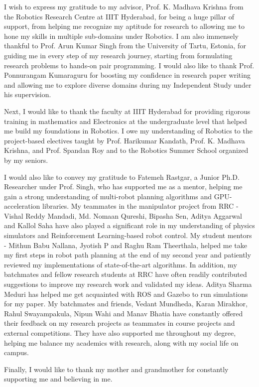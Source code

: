 I wish to express my gratitude to my advisor, Prof. K. Madhava Krishna from the Robotics Research Centre at IIIT Hyderabad, for being a huge pillar of support, from helping me recognize my aptitude for research to allowing me to hone my skills in multiple sub-domains under Robotics. I am also immensely thankful to Prof. Arun Kumar Singh from the University of Tartu, Estonia, for guiding me in every step of my research journey, starting from formulating research problems to hands-on pair programming. I would also like to thank Prof. Ponnurangam Kumaraguru for boosting my confidence in research paper writing and allowing me to explore diverse domains during my Independent Study under his supervision.

Next, I would like to thank the faculty at IIIT Hyderabad for providing rigorous training in mathematics and Electronics at the undergraduate level that helped me build my foundations in Robotics. I owe my understanding of Robotics to the project-based electives taught by Prof. Harikumar Kandath, Prof. K. Madhava Krishna, and Prof. Spandan Roy and to the Robotics Summer School organized by my seniors. 


I would also like to convey my gratitude to Fatemeh Rastgar, a Junior Ph.D. Researcher under Prof. Singh, who has supported me as a mentor, helping me gain a strong understanding of multi-robot planning algorithms and GPU-acceleration libraries. My teammates in the manipulator project from RRC - Vishal Reddy Mandadi, Md. Nomaan Qureshi, Bipasha Sen, Aditya Aggarwal and Kallol Saha have also played a significant role in my understanding of physics simulators and Reinforcement Learning-based robot control. My student mentors - Mithun Babu Nallana, Jyotish P and Raghu Ram Theerthala, helped me take my first steps in robot path planning at the end of my second year and patiently reviewed my implementations of state-of-the-art algorithms. In addition, my batchmates and fellow research students at RRC have often readily contributed suggestions to improve my research work and validated my ideas. Aditya Sharma Meduri has helped me get acquainted with ROS and Gazebo to run simulations for my paper. My batchmates and friends, Vedant Mundheda, Karan Mirakhor, Rahul Swayampakula, Nipun Wahi and Manav Bhatia have constantly offered their feedback on my research projects as teammates in course projects and external competitions. They have also supported me throughout my degree, helping me balance my academics with research, along with my social life on campus.

Finally, I would like to thank my mother and grandmother for constantly supporting me and believing in me. 


